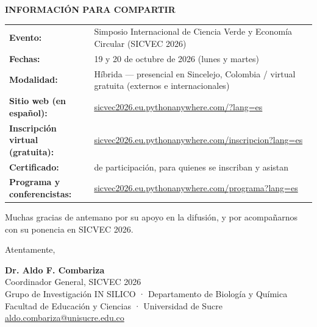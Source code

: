 \documentclass[11pt,a4paper]{article}
\begin{document}
\vspace{0.1cm}

\noindent
\textbf{INFORMACIÓN PARA COMPARTIR}

\begin{tabularx}{\linewidth}{@{}l X@{}}
\textbf{Evento:} & Simposio Internacional de Ciencia Verde y Economía Circular (SICVEC 2026) \\
\textbf{Fechas:} & 19 y 20 de octubre de 2026 (lunes y martes) \\
\textbf{Modalidad:} & Híbrida — presencial en Sincelejo, Colombia / virtual gratuita (externos e internacionales) \\
\textbf{Sitio web (en español):} & \href{https://sicvec2026.eu.pythonanywhere.com/?lang=es}{sicvec2026.eu.pythonanywhere.com/?lang=es} \\
\textbf{Inscripción virtual (gratuita):} & \href{https://sicvec2026.eu.pythonanywhere.com/inscripcion?lang=es}{sicvec2026.eu.pythonanywhere.com/inscripcion?lang=es} \\
\textbf{Certificado:} & de participación, para quienes se inscriban y asistan \\
\textbf{Programa y conferencistas:} & \href{https://sicvec2026.eu.pythonanywhere.com/programa?lang=es}{sicvec2026.eu.pythonanywhere.com/programa?lang=es} \\
\end{tabularx}

\vspace{0.1cm}

Muchas gracias de antemano por su apoyo en la difusión, y por acompañarnos con su ponencia en SICVEC 2026.

\vspace{0.15cm}

Atentamente,

\vspace{0.15cm}

\textbf{Dr. Aldo F. Combariza}\\
Coordinador General, SICVEC 2026\\
Grupo de Investigación IN SILICO · Departamento de Biología y Química\\
Facultad de Educación y Ciencias · Universidad de Sucre\\
\href{mailto:aldo.combariza@unisucre.edu.co}{aldo.combariza@unisucre.edu.co}
\end{document}
